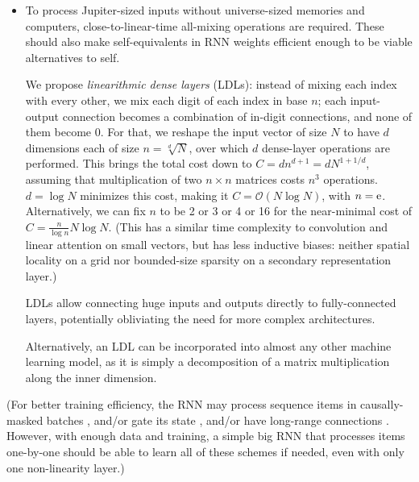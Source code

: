 \documentclass{article}
\begin{document}
\begin{itemize}
\item To process Jupiter-sized inputs without universe-sized memories and computers, close-to-linear-time all-mixing operations are required. These should also make self-equivalents in RNN weights efficient enough to be viable alternatives to self.

We propose \textit{linearithmic dense layers} (LDLs): instead of mixing each index with every other, we mix each digit of each index in base $n$; each input-output connection becomes a combination of in-digit connections, and none of them become 0. For that, we reshape the input vector of size $N$ to have $d$ dimensions each of size $n=\sqrt[d]{N}$, over which $d$ dense-layer operations are performed. This brings the total cost down to $C=dn^{d+1}=d N^{1+1/d}$, assuming that multiplication of two $n \times n$ matrices costs $n^3$ operations. $d=\log{N}$ minimizes this cost, making it $C=\mathcal{O}(N \log{N})$, with $n={\rm e}$. Alternatively, we can fix $n$ to be 2 or 3 or 4 or 16 for the near-minimal cost of $C=\frac{n}{\log{n}} N \log{N}$. (This has a similar time complexity to convolution and linear attention \cite{vaswani2017attention} on small vectors, but has less inductive biases: neither spatial locality on a grid nor bounded-size sparsity on a secondary representation layer.)

LDLs allow connecting huge inputs and outputs directly to fully-connected layers, potentially obliviating the need for more complex architectures.

Alternatively, an LDL can be incorporated into almost any other machine learning model, as it is simply a decomposition of a matrix multiplication along the inner dimension.
\end{itemize}

(For better training efficiency, the RNN may process sequence items in causally-masked batches \cite{NEURIPS2020_1457c0d6}, and/or gate its state \cite{cho2014learning} \cite{hochreiter1997lstm}, and/or have long-range connections \cite{dieng2017topicrnn}. However, with enough data and training, a simple big RNN that processes items one-by-one should be able to learn all of these schemes if needed, even with only one non-linearity layer.)
\end{document}
